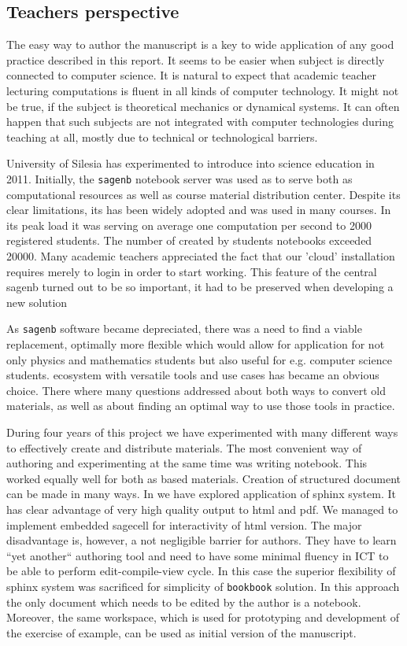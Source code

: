 \documentclass{deliverablereport}
\begin{document}
\subsection{Teachers perspective}

The easy way to author the manuscript is a key to wide application of
any good practice described in this report. It seems to be easier when
subject is directly connected to computer science. It is natural to
expect that academic teacher lecturing computations is fluent in all
kinds of computer technology. It might not be true, if the subject is
theoretical mechanics or dynamical systems. It can often happen that
such subjects are not integrated with computer technologies during
teaching at all, mostly due to technical or technological barriers.


University of Silesia has experimented to introduce \Sage into science
education in 2011. Initially, the \texttt{sagenb} notebook server was
used as to serve both as computational resources as well as course
material distribution center. Despite its clear limitations, its has
been widely adopted and was used in many courses. In its peak load it
was serving on average one computation per second to 2000 registered
students. The number of created by students notebooks exceeded
20000. Many academic teachers appreciated the fact that our 'cloud'
installation requires merely to login in order to start working. This
feature of the central sagenb turned out to be so important, it had to
be preserved when developing a new solution

As \texttt{sagenb} software became depreciated, there was a
need to find a viable replacement, optimally more flexible which would
allow for application for not only physics and mathematics students
but also useful for e.g. computer science students. \Jupyter
ecosystem with versatile tools and use cases has became an obvious
choice. There where many questions addressed about both ways to
convert old materials, as well as about finding an optimal way to use
those tools in practice. 

During four years of this project we have experimented with many
different ways to effectively create and distribute materials. The
most convenient way of authoring and experimenting at the same time
was writing \Jupyter notebook. This worked equally well for both \Sage
as \Python based materials. Creation of structured document can be
made in many ways. In  we have explored
application of sphinx system. It has clear advantage of very high
quality output to html and pdf. We managed to implement embedded
sagecell for interactivity of html version. The major disadvantage is,
however, a not negligible barrier for authors. They have to learn
``yet another`` authoring tool and need to have some minimal fluency
in ICT to be able to perform edit-compile-view cycle. In this case the
superior flexibility of sphinx system was sacrificed for simplicity of
\texttt{bookbook} solution. In this approach the only document which
needs to be edited by the author is a \Jupyter notebook. Moreover, the
same workspace, which is used for prototyping and development of the
exercise of example, can be used as initial version of the manuscript.
\end{document}
